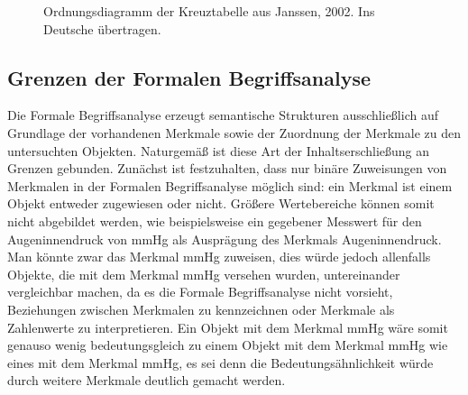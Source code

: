 \documentclass[pagesize,DIV=calc,12pt,final]{scrreprt}
\begin{document}
\begin{figure}[h!]
    \label{fig:hasse}
\centering
\caption{Ordnungsdiagramm der Kreuztabelle aus Janssen, 2002. Ins Deutsche übertragen.}
\end{figure}

\subsection{Grenzen der Formalen Begriffsanalyse}

Die Formale Begriffsanalyse erzeugt semantische Strukturen ausschließlich auf Grundlage der vorhandenen Merkmale sowie der Zuordnung der Merkmale zu den untersuchten Objekten. 
Naturgemäß ist diese Art der Inhaltserschließung an Grenzen gebunden. 
Zunächst ist festzuhalten, dass nur binäre Zuweisungen von Merkmalen in der Formalen Begriffsanalyse möglich sind: ein Merkmal ist einem Objekt entweder zugewiesen oder nicht. 
Größere Wertebereiche können somit nicht abgebildet werden, wie beispielsweise ein gegebener Messwert für den Augeninnendruck von \unit[17]{mmHg} als Ausprägung des Merkmals Augeninnendruck. 
Man könnte zwar das Merkmal \unit[17]{mmHg} zuweisen, dies würde jedoch allenfalls Objekte, die mit dem Merkmal \unit[17]{mmHg} versehen wurden, untereinander vergleichbar machen, da es die Formale Begriffsanalyse nicht vorsieht, Beziehungen zwischen Merkmalen zu kennzeichnen oder Merkmale als Zahlenwerte zu interpretieren. 
Ein Objekt mit dem Merkmal \unit[16]{mmHg} wäre somit genauso wenig bedeutungsgleich zu einem Objekt mit dem Merkmal \unit[17]{mmHg} wie eines mit dem Merkmal \unit[6] {mmHg}, es sei denn die Bedeutungsähnlichkeit würde durch weitere Merkmale deutlich gemacht werden. 
\end{document}
